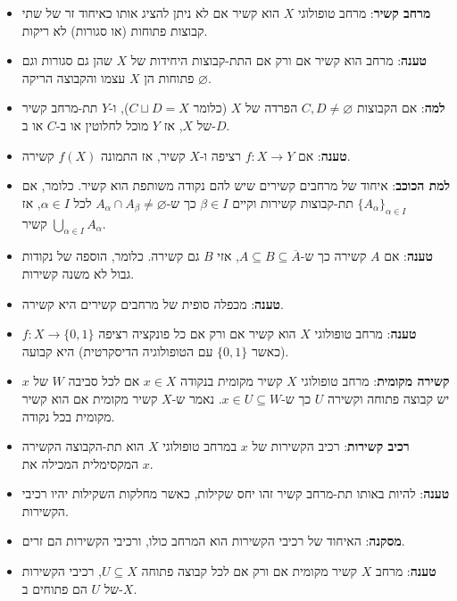 \documentclass{tstextbook}
\begin{document}
\begin{summary}
  \begin{itemize}
    \item \textbf{מרחב קשיר}: מרחב טופולוגי \(X\) הוא קשיר אם לא ניתן להציג אותו כאיחוד זר של שתי קבוצות פתוחות (או סגורות) לא ריקות.
    \item \textbf{טענה}: מרחב הוא קשיר אם ורק אם התת-קבוצות היחידות של \(X\) שהן גם סגורות וגם פתוחות הן \(X\) עצמו והקבוצה הריקה \(\varnothing\).
    \item \textbf{למה}: אם הקבוצות \(C,D\neq \varnothing\) הפרדה של \(X\) (כלומר \(C\sqcup D = X\)), ו-\(Y\) תת-מרחב קשיר של \(X\), אז \(Y\) מוכל לחלוטין או ב-\(C\) או ב-\(D\).
    \item \textbf{טענה}: אם \(f:X\to Y\) רציפה ו-\(X\) קשיר, אז התמונה \(f(X)\) קשירה.
    \item \textbf{למת הכוכב}: איחוד של מרחבים קשירים שיש להם נקודה משותפת הוא קשיר. כלומר, אם \(\{ A_{\alpha} \}_{\alpha \in I}\) תת-קבוצות קשירות וקיים \(\beta \in I\) כך ש-\(A_{\alpha} \cap A_{\beta} \neq \varnothing\) לכל \(\alpha \in I\), אז \(\bigcup_{\alpha \in I}A_{\alpha}\) קשיר.
    \item \textbf{טענה}: אם \(A\) קשירה כך ש-\(A\subseteq B\subseteq \overline{A}\), אזי \(B\) גם קשירה. כלומר, הוספה של נקודות גבול לא משנה קשירות.
    \item \textbf{טענה}: מכפלה סופית של מרחבים קשירים היא קשירה.
    \item \textbf{טענה}: מרחב טופולוגי \(X\) הוא קשיר אם ורק אם כל פונקציה רציפה \(f:X\to \{ 0,1 \}\) (כאשר \(\{0,1\}\) עם הטופולוגיה הדיסקרטית) היא קבועה.
    \item \textbf{קשירה מקומית}: מרחב טופולוגי \(X\) קשיר מקומית בנקודה \(x \in X\) אם לכל סביבה \(W\) של \(x\) יש קבוצה פתוחה וקשירה \(U\) כך ש-\(x \in U \subseteq W\). נאמר ש-\(X\) קשיר מקומית אם הוא קשיר מקומית בכל נקודה.
    \item \textbf{רכיב קשירות}: רכיב הקשירות של \(x\) במרחב טופולוגי \(X\) הוא תת-הקבוצה הקשירה המקסימלית המכילה את \(x\).
    \item \textbf{טענה}: להיות באותו תת-מרחב קשיר זהו יחס שקילות, כאשר מחלקות השקילות יהיו רכיבי הקשירות.
    \item \textbf{מסקנה}: האיחוד של רכיבי הקשירות הוא המרחב כולו, ורכיבי הקשירות הם זרים.
    \item \textbf{טענה}: מרחב \(X\) קשיר מקומית אם ורק אם לכל קבוצה פתוחה \(U\subseteq X\), רכיבי הקשירות של \(U\) הם פתוחים ב-\(X\).
  \end{itemize}
\end{summary}
\end{document}
